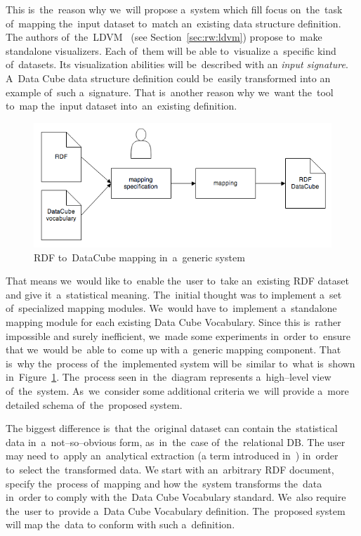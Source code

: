 This is~the~reason why we~will propose a~system which fill focus on~the~task of~mapping the~input dataset to~match an~existing data structure definition. 
The authors of~the~LDVM~\cite{ldvm} (see Section~\ref{sec:rw:ldvm}) propose to~make standalone
visualizers. Each of~them will 
be able to~visualize a~specific kind of~datasets. Its visualization abilities will be~described with
an \emph{input signature}. A~Data Cube data structure definition could be~easily transformed into
an example of~such a~signature. That is~another reason why we~want the~tool to~map the~input dataset into~an~existing definition.

\begin{figure}
	\centering
	\includegraphics[width=140mm]{img/generic-mapping.png}
	\caption{RDF to~DataCube mapping in~a~generic system}
	\label{fig:generic-mapping}
\end{figure}

That means we~would like to~enable the~user to~take an~existing RDF
dataset and give it~a~statistical meaning. The~initial thought was to
implement a~set of~specialized 
mapping modules. We~would have to~implement a~standalone mapping module for
each existing Data Cube Vocabulary. Since this is~rather impossible and 
surely inefficient, we~made some experiments in~order to~ensure that we~would be~able to~come 
up with a~generic mapping component. That is~why the~process of~the~implemented
system will be~similar to~what is~shown in~Figure~\ref{fig:generic-mapping}. The~process seen in~the~diagram represents a~high--level view of~the~system. As~we~consider some additional criteria we~will provide a~more detailed schema of~the~proposed system. 

The biggest difference is~that the~original dataset can contain the~statistical 
data in~a~not--so--obvious form, as~in~the~case of~the~relational DB.
The user may need to~apply an~analytical 
extraction (a term introduced in~\cite{ldvm}) in~order to~select the~transformed data.
We start with an~arbitrary RDF document, 
specify the~process of~mapping and how the~system transforms the~data in~order
to comply with the~Data Cube Vocabulary standard. We~also require the~user to~provide a~Data Cube Vocabulary definition. The~proposed system will map the~data
to conform with such a~definition.

